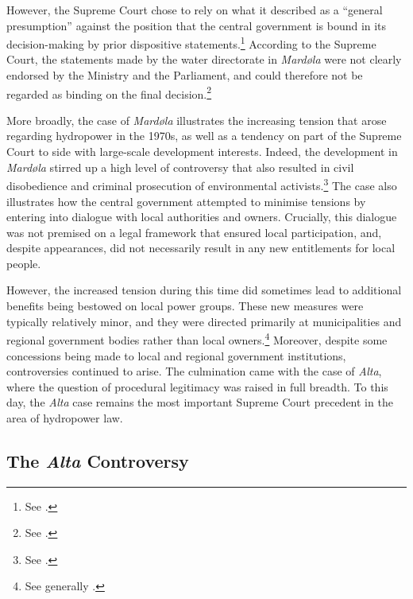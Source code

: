 However, the Supreme Court chose to rely on what it described as a ``general presumption'' against the position that the central government is bound in its decision-making by prior dispositive statements.\footnote{See \cite[110]{mardøla73}.} According to the Supreme Court, the statements made by the water directorate in {\it Mardøla} were not clearly endorsed by the Ministry and the Parliament, and could therefore not be regarded as binding on the final decision.\footnote{See \cite[111]{mardøla73}.} 

More broadly, the case of {\it Mardøla} illustrates the increasing tension that arose regarding hydropower in the 1970s, as well as a tendency on part of the Supreme Court to side with large-scale development interests. Indeed, the development in {\it Mardøla} stirred up a high level of controversy that also resulted in civil disobedience and criminal prosecution of environmental activists.\footnote{See \cite{mar71}.} The case also illustrates how the central government attempted to minimise tensions by entering into dialogue with local authorities and owners. Crucially, this dialogue was not premised on a legal framework that ensured local participation, and, despite appearances, did not necessarily result in any new entitlements for local people.

However, the increased tension during this time did sometimes lead to additional benefits being bestowed on local power groups. These new measures were typically relatively minor, and they were directed primarily at municipalities and regional government bodies rather than local owners.\footnote{See generally \cite{nilsen08}.} Moreover, despite some concessions being made to local and regional government institutions, controversies continued to arise. The culmination came with the case of {\it Alta}, where the question of procedural legitimacy was raised in full breadth. To this day, the {\it Alta} case remains the most important Supreme Court precedent in the area of hydropower law.

\subsection{The {\it Alta} Controversy}\label{sec:alta}

